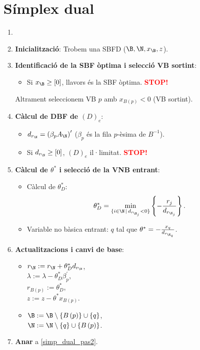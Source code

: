 \section{Símplex dual}
\begin{alg}
    \begin{enumerate}
        \item[]
        \item {\bf Inicialització}: Trobem una SBFD ($\B, \N, x_\B, z$).
        \item \label{simp_dual_pas2} {\bf Identificació de la SBF òptima i selecció VB sortint}:
            \begin{itemize}
                \item Si $x_\B \geq \left[0\right]$, llavors és la SBF òptima. \textcolor{red}{\bf STOP!}
            \end{itemize}
            Altrament seleccionem VB $p$ amb $x_{B\left(p\right)} < 0$ (VB sortint).
        \item {\bf Càlcul de DBF de $\left(D\right)_e$}:
            \begin{itemize}
                \item $d_{r_\N} = \left(\beta_p A_\N\right)^\prime$ ($\beta_p$ és la fila $p$-èsima de $B^{-1}$).
                \item Si $d_{r_\N} \geq \left[0\right]$, $\left(D\right)_e$ il·limitat. \textcolor{red}{\bf STOP!}
            \end{itemize}
        \item {\bf Càlcul de $\theta^*$ i selecció de la VNB entrant}:
            \begin{itemize}
                \item Càlcul de $\theta_D^*$: 
                    \[\theta_D^* = \min_{\{i \in \N \,|\, d_{r_{\N_j}} < 0\}} \left\{-\frac{r_j}{d_{r_{\N_j}}} \right\}.\]
                \item Variable no bàsica entrant: $q$ tal que $\theta^* = -\frac{x_q}{d_{r_{\N_q}}}$.
            \end{itemize}
        \item {\bf Actualitzacions i canvi de base}:
            \begin{itemize}
                \item $r_\N := r_\N + \theta_D^* d_{r_\N}$, \\
                    $\lambda := \lambda - \theta_D^* \beta_p^\prime$, \\
                    $r_{B\left(p\right)} := \theta_D^*$, \\
                    $z := z - \theta^* x_{B\left(p\right)}$.
                \item $\B := \B \setminus \left\{B\left(p\right)\right\} \cup \left\{q\right\}$, \\
                    $\N := \N \setminus \left\{q\right\} \cup \left\{B\left(p\right)\right\}$.
            \end{itemize}
        \item {\bf Anar} a \ref{simp_dual_pas2}.
    \end{enumerate}
\end{alg}

